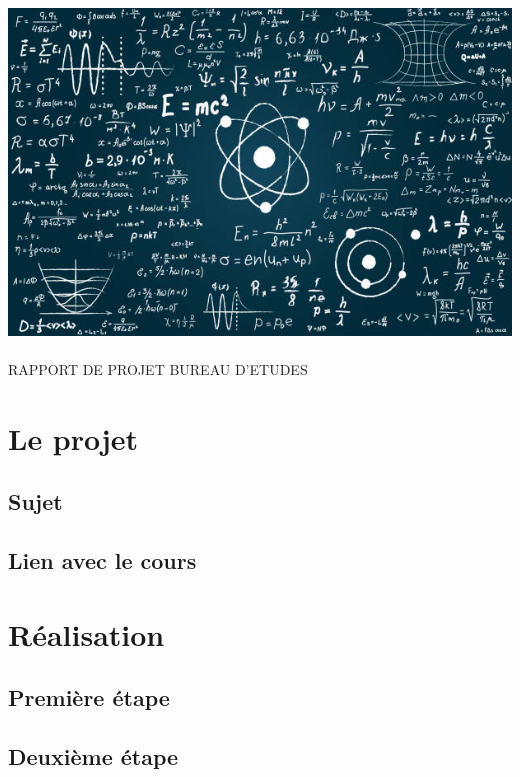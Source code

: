 \documentclass[12pt,a4paper]{report}
\begin{document}
\begin{titlepage}
	\begin{center}

		\includegraphics[scale=1.5]{garde.jpg}~\\[1.5cm]
		\textsc{\LARGE RAPPORT DE PROJET BUREAU D'ETUDES}\\[2cm]	
	
	\end{center}
\end{titlepage}



   \dominitoc
   \tableofcontents
   \chapter{Le projet}
      \section{Sujet}
      \section{Lien avec le cours}
   \chapter{Réalisation}
   		\section{Première étape}
   		\section{Deuxième étape}
\end{document}
